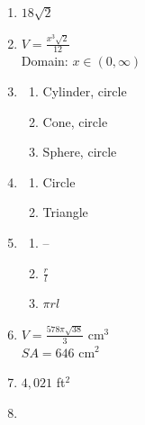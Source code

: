 \documentclass{article}
\begin{document}
\begin{enumerate}
\begin{enumerate}
	\item Center: $(3, -\frac{1}{2})$ \\
		Radius: $\frac{7}{2}$
	
	\end{enumerate}
	
\item $18\sqrt{2}$

\item $V = \frac{x^3\sqrt{2}}{12}$ \\
	Domain: $x \in (0, \infty)$

\item

	\begin{enumerate}
	
	\item Cylinder, circle
	
	\item Cone, circle
	
	\item Sphere, circle
	
	\end{enumerate}
	
\item

	\begin{enumerate}
	
	\item Circle
	
	\item Triangle
	
	\end{enumerate}
	
\item

	\begin{enumerate}
	
	\item --
	
	\item $\frac{r}{l}$
	
	\item $\pi r l$
	
	\end{enumerate}
	
\item $V = \frac{578 \pi \sqrt{38}}{3}$ cm$^3$ \\
	$SA = 646$ cm$^2$
	
\item $4,021$ ft$^2$

\item


\end{enumerate}
\end{document}
